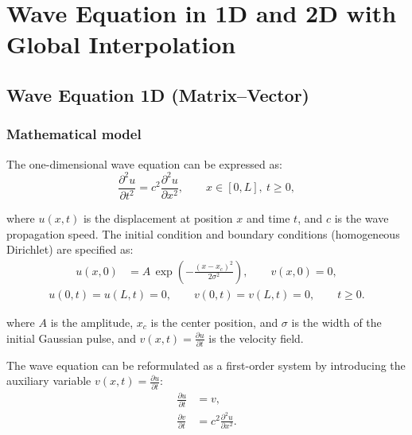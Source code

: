 
\chapter{Wave Equation in 1D and 2D with Global Interpolation}
\label{ch::chapter8}

\section{Wave Equation 1D (Matrix–Vector)}
\label{sec:wave_1d_mxv}

\subsection{Mathematical model}

The one-dimensional wave equation can be expressed as:
\begin{equation}
\frac{\partial^2 u}{\partial t^2} = c^2 \frac{\partial^2 u}{\partial x^2}, 
\qquad x\in[0,L],\ t\ge 0,
\label{eq:wave_equation_1d}
\end{equation}

where $u(x,t)$ is the displacement at position $x$ and time $t$, and $c$ is the wave propagation speed. The initial condition and boundary conditions (homogeneous Dirichlet) are specified as:
\begin{align}
u(x,0) &= A\,\exp\!\left(-\frac{(x-x_c)^2}{2\sigma^2}\right), \qquad v(x,0) = 0,
\label{eq:initial_conditions_1d}
\end{align}
\vspace{-0.75em}
\begin{align}
u(0,t) = u(L,t) = 0, \qquad v(0,t) = v(L,t) = 0, \qquad t\ge 0.
\label{eq:boundary_conditions_1d}
\end{align}

where $A$ is the amplitude, $x_c$ is the center position, and $\sigma$ is the width of the initial Gaussian pulse, and $v(x,t) = \frac{\partial u}{\partial t}$ is the velocity field.

The wave equation can be reformulated as a first-order system by introducing the auxiliary variable $v(x,t) = \frac{\partial u}{\partial t}$:
\begin{equation}
\begin{aligned}
\frac{\partial u}{\partial t} &= v, \\
\frac{\partial v}{\partial t} &= c^2 \frac{\partial^2 u}{\partial x^2}.
\end{aligned}
\label{eq:coupled_system_1d}
\end{equation}


